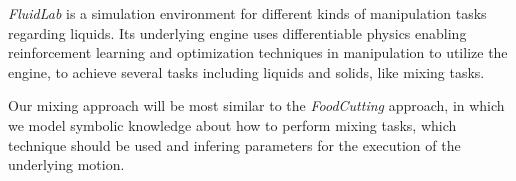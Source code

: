 \textit{FluidLab} \cite{xian2023fluidlab} is a simulation environment for different kinds of manipulation tasks regarding liquids. Its underlying engine uses differentiable physics 
enabling reinforcement learning and optimization techniques in manipulation to utilize the engine, to achieve several tasks 
including liquids and solids, like mixing tasks. 

Our mixing approach will be most similar to the \textit{FoodCutting} approach, in which we model symbolic knowledge about how to perform
mixing tasks, which technique should be used and infering parameters for the execution of the underlying motion.

